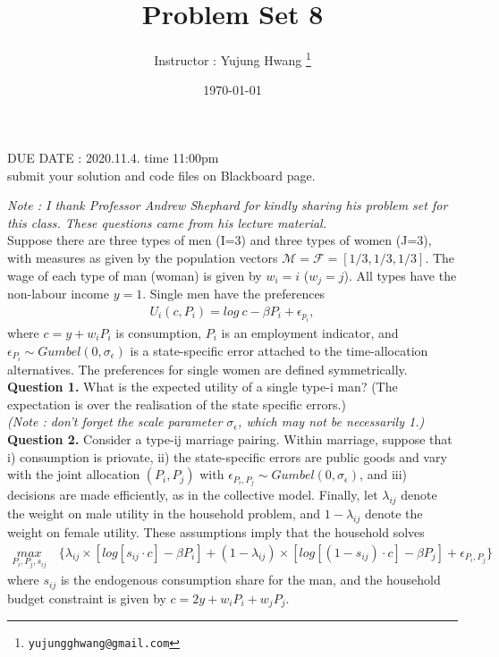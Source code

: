 \documentclass[paper=a4, fontsize=13pt]{extarticle} %
\numberwithin{equation}{section} %
\numberwithin{figure}{section} %
\numberwithin{table}{section} %
\begin{document}
\title{	
\normalfont \normalsize 
\huge Problem Set 8
}
\author{
Instructor : Yujung Hwang \thanks{\texttt{yujungghwang@gmail.com}}} %
\date{\today} %
\maketitle %

\upshape \mdseries 
\begin{center}
DUE DATE : 2020.11.4. time 11:00pm \\
submit your solution and code files on Blackboard page.
\end{center}

\textit{Note : I thank Professor Andrew Shephard for kindly sharing his problem set for this class. These questions came from his lecture material.} \\

\indent Suppose there are three types of men (I=3) and three types of women (J=3), with measures as given by the population vectors $\mathcal{M}=\mathcal{F}=[1/3,1/3,1/3]$. The wage of each type of man (woman) is given by $w_i = i$ ($w_j =j$). All types have the non-labour income $y=1$. Single men have the preferences
\begin{gather}
U_i (c, P_i) = log ~c - \beta P_i + \epsilon_{p_i},
\end{gather}
where $c=y+w_i P_i$ is consumption, $P_i$ is an employment indicator, and $\epsilon_{P_i} \sim Gumbel (0, \sigma_{\epsilon})$ is a state-specific error attached to the time-allocation alternatives. The preferences for single women are defined symmetrically.\\

\textbf{Question 1.} What is the expected utility of a single type-i man? (The expectation is over the realisation of the state specific errors.) \\
\textit{(Note : don't forget the scale parameter $\sigma_{\epsilon}$, which may not be necessarily 1.)} \\


\textbf{Question 2.} Consider a type-ij marriage pairing. Within marriage, suppose that i) consumption is priovate, ii) the state-specific errors are public goods and vary with the joint allocation $(P_i, P_j)$ with $\epsilon_{P_i, P_j} \sim Gumbel (0, \sigma_{\epsilon})$, and iii) decisions are made efficiently, as in the collective model. Finally, let $\lambda_{ij}$ denote the weight on male utility in the household problem, and $1-\lambda_{ij}$ denote the weight on female utility. These assumptions imply that the household solves
\begin{gather}
\underset{P_i, P_j, s_{ij}}{max} \quad \{ \lambda_{ij} \times [ log [s_{ij} \cdot c] - \beta P_i ] + (1-\lambda_{ij}) \times [ log [(1-s_{ij}) \cdot c]  - \beta P_j ] + \epsilon_{P_i, P_j}  \}
\end{gather}
where $s_{ij}$ is the endogenous consumption share for the man, and the household budget constraint is given by $c=2y + w_i P_i + w_j P_j$. \\
\end{document}
